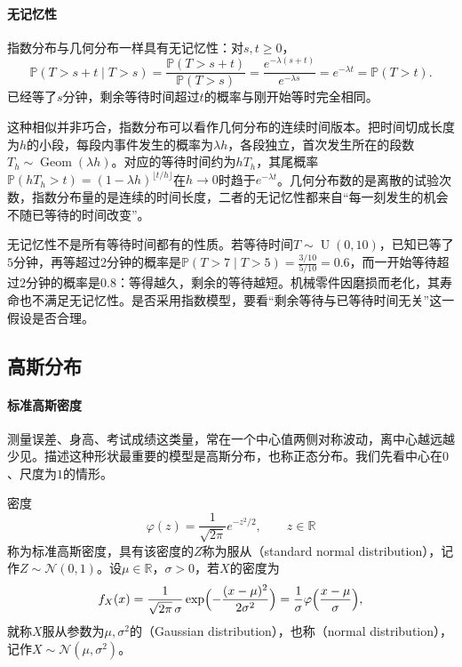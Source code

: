 \paragraph{无记忆性}
指数分布与几何分布一样具有无记忆性：对$s,t\geq0$，
\[
  \mathbb{P}(T>s+t\mid T>s)=\frac{\mathbb{P}(T>s+t)}{\mathbb{P}(T>s)}=\frac{e^{-\lambda(s+t)}}{e^{-\lambda s}}=e^{-\lambda t}=\mathbb{P}(T>t).
\]
已经等了$s$分钟，剩余等待时间超过$t$的概率与刚开始等时完全相同。

这种相似并非巧合，指数分布可以看作几何分布的连续时间版本。把时间切成长度为$h$的小段，每段内事件发生的概率为$\lambda h$，各段独立，首次发生所在的段数$T_h\sim\operatorname{Geom}(\lambda h)$。对应的等待时间约为$hT_h$，其尾概率$\mathbb{P}(hT_h>t)=(1-\lambda h)^{\lfloor t/h\rfloor}$在$h\to0$时趋于$e^{-\lambda t}$。几何分布数的是离散的试验次数，指数分布量的是连续的时间长度，二者的无记忆性都来自“每一刻发生的机会不随已等待的时间改变”。

无记忆性不是所有等待时间都有的性质。若等待时间$T\sim\operatorname{U}(0,10)$，已知已等了$5$分钟，再等超过$2$分钟的概率是$\mathbb{P}(T>7\mid T>5)=\frac{3/10}{5/10}=0.6$，而一开始等待超过$2$分钟的概率是$0.8$：等得越久，剩余的等待越短。机械零件因磨损而老化，其寿命也不满足无记忆性。是否采用指数模型，要看“剩余等待与已等待时间无关”这一假设是否合理。

\subsection{高斯分布}
\label{sec:prob-gaussian}

\paragraph{标准高斯密度}
测量误差、身高、考试成绩这类量，常在一个中心值两侧对称波动，离中心越远越少见。描述这种形状最重要的模型是高斯分布，也称正态分布。我们先看中心在$0$、尺度为$1$的情形。

\begin{definition}[高斯分布]
\label{def:prob-gaussian}
密度
\[
  \varphi(z)=\frac{1}{\sqrt{2\pi}}e^{-z^2/2},\qquad z\in\mathbb{R}
\]
称为标准高斯密度，具有该密度的$Z$称为服从（standard normal distribution），记作$Z\sim\mathcal{N}(0,1)$。设$\mu\in\mathbb{R}$，$\sigma>0$，若$X$的密度为
\[
  f_X(x)=\frac{1}{\sqrt{2\pi}\,\sigma}\exp\Bigl(-\frac{(x-\mu)^2}{2\sigma^2}\Bigr)=\frac1\sigma\varphi\Bigl(\frac{x-\mu}{\sigma}\Bigr),
\]
就称$X$服从参数为$\mu,\sigma^2$的（Gaussian distribution），也称（normal distribution），记作$X\sim\mathcal{N}(\mu,\sigma^2)$。
\end{definition}

